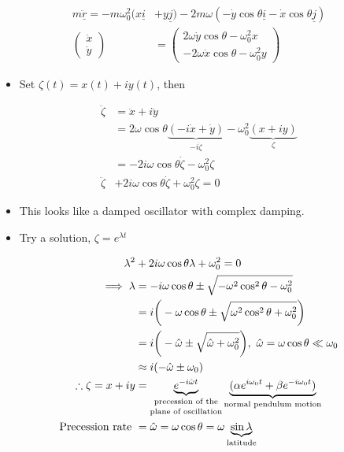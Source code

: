 \documentclass[a4paper,11pt,normalem]{article}
\begin{document}
\[
    \begin{aligned}
    m\underline{\ddot{r}} = -m\omega_0^2 (x\underline{i} &+ y\underline{j}) - 2m\omega(-\dot{y}\cos\theta\underline{i} - \dot{x}\cos\theta\underline{j}) \\
    \begin{pmatrix} \ddot{x} \\ \ddot{y} \end{pmatrix} &= \begin{pmatrix} 2\omega\dot{y}\cos\theta - \omega_0^2 x \\ -2\omega\dot{x}\cos\theta - \omega_0^2 y \end{pmatrix}
    \end{aligned}
\]

\begin{itemize}
\item
  Set \(\zeta(t) = x(t) + iy(t)\), then
\end{itemize}

\[
    \begin{aligned}
    \ddot{\zeta} &= \ddot{x} + i\ddot{y} \\
    &= 2\omega\cos\theta\underbrace{(-i\dot{x} + \dot{y})}_{-i\dot{\zeta}} - \omega_0^2\underbrace{(x + iy)}_{\zeta} \\
    &= -2i\omega\cos\theta \dot{\zeta} - \omega_0^2 \zeta \\
    \ddot{\zeta} &+ 2i\omega\cos\theta\dot{\zeta} + \omega_0^2 \zeta = 0
    \end{aligned}
\]

\begin{itemize}
\item
  This looks like a damped oscillator with complex damping.
\item
  Try a solution, \(\zeta = e^{\lambda t}\)
\end{itemize}

\[
    \begin{aligned}
    \lambda^2 &+ 2i\omega\cos\theta\lambda + \omega_0^2 = 0 \\
    \implies \lambda &= -i\omega\cos\theta \pm \sqrt{-\omega^2\cos^2\theta - \omega_0^2} \\
    &= i\bigg(-\omega\cos\theta \pm \sqrt{\omega^2\cos^2\theta + \omega_0^2}\bigg) \\
    &= i\bigg(-\hat{\omega} \pm \sqrt{\hat{\omega} + \omega_0^2}\bigg),~ \hat{\omega} = \omega\cos\theta \ll \omega_0 \\
    &\approx i(-\hat{\omega} \pm \omega_0) \\
    \therefore \zeta = x + iy &= \underbrace{e^{-i\hat{\omega}t}}_{\text{\shortstack{precession of the \\ plane of oscillation}}}\underbrace{(\alpha e^{i\omega_0 t} + \beta e^{-i\omega_0 t})}_{\text{normal pendulum motion}} \\
    \text{Precession rate } &= \hat{\omega} = \omega\cos\theta = \omega\underbrace{\sin\lambda}_{\text{latitude}}
    \end{aligned}
\]
\end{document}
